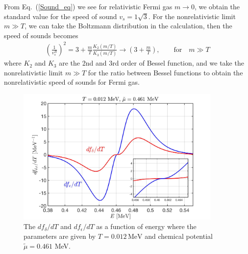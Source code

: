\documentclass[sn-mathphys,Numbered]{sn-jnl}
\theoremstyle{thmstyleone}%
\theoremstyle{thmstyletwo}%
\theoremstyle{thmstylethree}%
\begin{document}
From Eq.~(\ref{Sound_eq}) we see for relativistic Fermi gas $m\to 0$, we obtain the standard value for the speed of sound $v_s=1\sqrt{3}$. For the nonrelativistic limit $m\gg T$, we can take the Boltzmann distribution in the calculation, then the speed of sounds becomes
\begin{align}
\left(\frac{1}{v^B_s}\right)^2=3+\frac{m}{T}\frac{K_2(m/T)}{K_3(m/T)}\longrightarrow\left(3+\frac{m}{T}\right),\qquad \mathrm{for}\quad m\gg T
\end{align}
where $K_2$ and $K_3$ are the 2nd and 3rd order of Bessel function, and we take the nonrelativistic limit $m\gg T$ for the ratio between Bessel functions to obtain the nonrelativistic speed of sounds for Fermi gas.

\begin{figure}[h]
\begin{center}
\includegraphics[width=0.9\textwidth]{./plot/NewFermi_dfdT002}
\caption{The $df_\delta/dT$ and $df_\epsilon/dT$ as a function of energy where the parameters are given by $T=0.012\,\mathrm{MeV}$ and chemical potential $\tilde\mu=0.461$ MeV.}
\label{dfdT_fig}
\end{center}
\end{figure}
\end{document}
